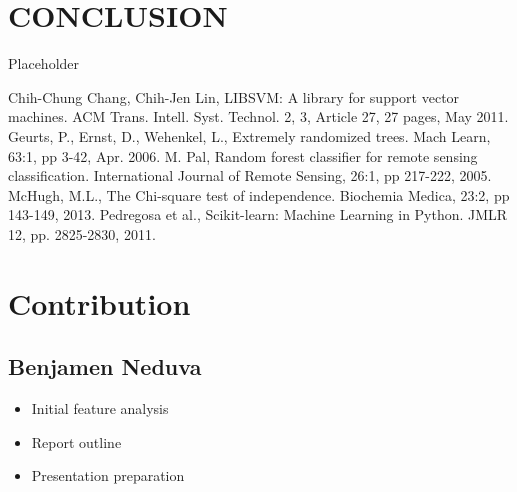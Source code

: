 \documentclass[letterpaper, 12 pt, conference]{ieeeconf}  %
\begin{document}
\section{CONCLUSION}

Placeholder

\addtolength{\textheight}{-12cm}   %








\begin{thebibliography}{99}

 Chih-Chung Chang, Chih-Jen Lin, LIBSVM: A library for support vector machines. ACM Trans. Intell. Syst. Technol. 2, 3, Article 27, 27 pages, May 2011.
 Geurts, P., Ernst, D., Wehenkel, L., Extremely randomized trees. Mach Learn, 63:1, pp 3-42, Apr. 2006.
 M. Pal, Random forest classifier for remote sensing classification. International Journal of Remote Sensing, 26:1, pp 217-222, 2005.
 McHugh, M.L., The Chi-square test of independence. Biochemia Medica, 23:2, pp 143-149, 2013.
 Pedregosa et al., Scikit-learn: Machine Learning in Python. JMLR 12, pp. 2825-2830, 2011.




\end{thebibliography}

\section{Contribution}

\subsection*{Benjamen Neduva}
        \begin{itemize}
                \item Initial feature analysis
                \item Report outline
                \item Presentation preparation
        \end{itemize}
\end{document}
